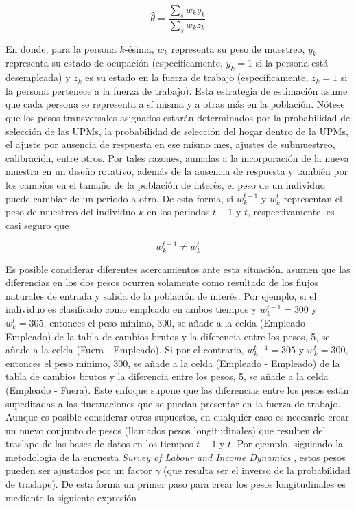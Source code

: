 \[\hat\theta=\frac{\sum_s w_ky_k}{\sum_s w_kz_k}\]

En donde, para la persona \(k\)-ésima, \(w_k\) representa su peso de muestreo, \(y_k\) representa su estado de ocupación (específicamente, \(y_k=1\) si la persona está desempleada) y \(z_k\) es su estado en la fuerza de trabajo (específicamente, \(z_k=1\) si la persona pertenece a la fuerza de trabajo). Esta estrategia de estimación asume que cada persona se representa a sí misma y a otras más en la población. Nótese que los pesos transversales asignados estarán determinados por la probabilidad de selección de las UPMs, la probabilidad de selección del hogar dentro de la UPMs, el ajuste por ausencia de respuesta en ese mismo mes, ajustes de submuestreo, calibración, entre otros. Por tales razones, aunadas a la incorporación de la nueva muestra en un diseño rotativo, además de la ausencia de respuesta y también por los cambios en el tamaño de la población de interés, el peso de un individuo puede cambiar de un periodo a otro. De esta forma, si \(w_k^{t-1}\) y \(w_k^{t}\) representan el peso de muestreo del individuo \(k\) en los periodos \(t-1\) y \(t\), respectivamente, es casi seguro que

\[w_k^{t-1} \neq w_k^t\]

Es posible considerar diferentes acercamientos ante esta situación. \citet{Feinberg_Stasny_1983} asumen que las diferencias en los dos pesos ocurren solamente como resultado de los flujos naturales de entrada y salida de la población de interés. Por ejemplo, si el individuo es clasificado como empleado en ambos tiempos y \(w_k^{t-1}=300\) y \(w_k^{t}=305\), entonces el peso mínimo, 300, se añade a la celda (Empleado - Empleado) de la tabla de cambios brutos y la diferencia entre los pesos, 5, se añade a la celda (Fuera - Empleado). Si por el contrario, \(w_k^{t-1}=305\) y \(w_k^{t}=300\), entonces el peso mínimo, 300, se añade a la celda (Empleado - Empleado) de la tabla de cambios brutos y la diferencia entre los pesos, 5, se añade a la celda (Empleado - Fuera). Este enfoque supone que las diferencias entre los pesos están supeditadas a las fluctuaciones que se puedan presentar en la fuerza de trabajo. Aunque es posible considerar otros supuestos, en cualquier caso es necesario crear un nuevo conjunto de pesos (llamados pesos longitudinales) que resulten del traslape de las bases de datos en los tiempos \(t-1\) y \(t\). Por ejemplo, siguiendo la metodología de la encuesta \emph{Survey of Labour and Income Dynamics} \citep{Naud_2002, LaRoche_2003}, estos pesos pueden ser ajustados por un factor \(\gamma\) (que resulta ser el inverso de la probabilidad de traslape). De esta forma un primer paso para crear los pesos longitudinales es mediante la siguiente expresión

